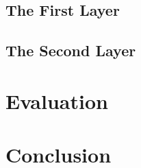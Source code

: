 \subsection{The First Layer}

\subsection{The Second Layer}

\section{Evaluation}

\section{Conclusion}

